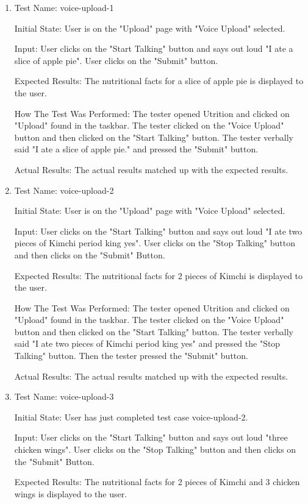 \documentclass[12pt, titlepage]{article}
\begin{document}
\begin{enumerate}
		\item{Test Name: voice-upload-1}
		
		Initial State: User is on the "Upload" page with "Voice Upload" selected.
		
		Input: User clicks on the "Start Talking" button and says out loud "I ate a slice of apple pie". User clicks on the "Submit" button.
		
		Expected Results: The nutritional facts for a slice of apple pie is displayed to the user.
		
		How The Test Was Performed: The tester opened Utrition and clicked on "Upload" found in the taskbar. The tester clicked on the "Voice Upload" button and then clicked on the "Start Talking" button. The tester verbally said "I ate a slice of apple pie." and pressed the "Submit" button.
		
		Actual Results: The actual results matched up with the expected results.
		
		\item{Test Name: voice-upload-2}
		
		Initial State: User is on the "Upload" page with "Voice Upload" selected.
		
		Input: User clicks on the "Start Talking" button and says out loud "I ate two pieces of Kimchi period king yes". User clicks on the "Stop Talking" button and then clicks on the "Submit" Button.
		
		Expected Results: The nutritional facts for 2 pieces of Kimchi is displayed to the user.
		
		How The Test Was Performed: The tester opened Utrition and clicked on "Upload" found in the taskbar. The tester clicked on the "Voice Upload" button and then clicked on the "Start Talking" button. The tester verbally said "I ate two pieces of Kimchi period king yes" and pressed the "Stop Talking" button. Then the tester pressed the "Submit" button.
		
		Actual Results: The actual results matched up with the expected results.
		
		\item{Test Name: voice-upload-3}
		
		Initial State: User has just completed test case voice-upload-2.
		
		Input: User clicks on the "Start Talking" button and says out loud "three chicken wings". User clicks on the "Stop Talking" button and then clicks on the "Submit" Button.
		
		Expected Results: The nutritional facts for 2 pieces of Kimchi and 3 chicken wings is displayed to the user.
		

\end{enumerate}
\end{document}
